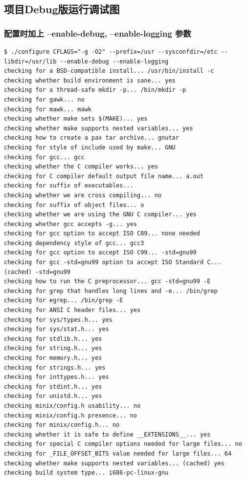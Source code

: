 \documentclass[11pt,a4paper]{article}
\begin{document}
\subsection{项目Debug版运行调试图}

\subsubsection{配置时加上 --enable-debug, --enable-logging 参数}

{\begin{shaded}\begin{verbatim}
$ ./configure CFLAGS="-g -O2" --prefix=/usr --sysconfdir=/etc --libdir=/usr/lib --enable-debug --enable-logging
checking for a BSD-compatible install... /usr/bin/install -c
checking whether build environment is sane... yes
checking for a thread-safe mkdir -p... /bin/mkdir -p
checking for gawk... no
checking for mawk... mawk
checking whether make sets $(MAKE)... yes
checking whether make supports nested variables... yes
checking how to create a pax tar archive... gnutar
checking for style of include used by make... GNU
checking for gcc... gcc
checking whether the C compiler works... yes
checking for C compiler default output file name... a.out
checking for suffix of executables... 
checking whether we are cross compiling... no
checking for suffix of object files... o
checking whether we are using the GNU C compiler... yes
checking whether gcc accepts -g... yes
checking for gcc option to accept ISO C89... none needed
checking dependency style of gcc... gcc3
checking for gcc option to accept ISO C99... -std=gnu99
checking for gcc -std=gnu99 option to accept ISO Standard C... (cached) -std=gnu99
checking how to run the C preprocessor... gcc -std=gnu99 -E
checking for grep that handles long lines and -e... /bin/grep
checking for egrep... /bin/grep -E
checking for ANSI C header files... yes
checking for sys/types.h... yes
checking for sys/stat.h... yes
checking for stdlib.h... yes
checking for string.h... yes
checking for memory.h... yes
checking for strings.h... yes
checking for inttypes.h... yes
checking for stdint.h... yes
checking for unistd.h... yes
checking minix/config.h usability... no
checking minix/config.h presence... no
checking for minix/config.h... no
checking whether it is safe to define __EXTENSIONS__... yes
checking for special C compiler options needed for large files... no
checking for _FILE_OFFSET_BITS value needed for large files... 64
checking whether make supports nested variables... (cached) yes
checking build system type... i686-pc-linux-gnu

\end{verbatim}
\end{shaded}}
\end{document}
